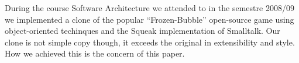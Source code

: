 During the course Software Architecture we 
attended to in the semestre 2008/09 we 
implemented a clone of the popular ``Frozen-Bubble''
open-source game using object-oriented techinques 
and the Squeak implementation of Smalltalk.
Our clone is not simple copy though, it exceeds 
the original in extensibility and style. How we 
achieved this is the concern of this paper.
